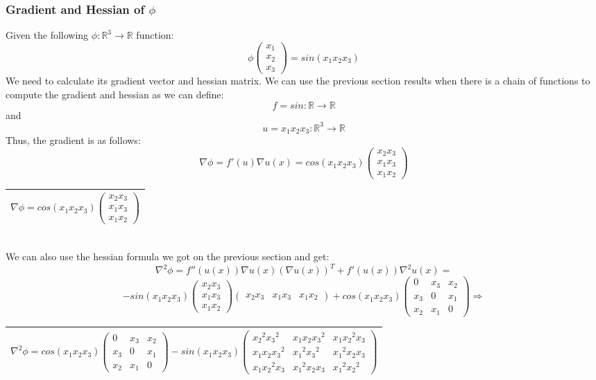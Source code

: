 \documentclass{article}
\newcommand{\rectres}[1]{
\begin{center}
\begin{tabular}{ |c| }
\hline
 #1\\
\hline
\end{tabular}
\end{center}
}
\begin{document}
\subsubsection{Gradient and Hessian of $\phi$}
Given the following $\phi:\mathbb{R}^3\rightarrow\mathbb{R}$ function:
$$\phi \begin{pmatrix}x_1\\x_2\\x_3 \end{pmatrix} = sin(x_1x_2x_3)$$
We need to calculate its gradient vector and hessian matrix.
We can use the previous section results when there is a chain of functions to compute the gradient and hessian as we can define:
$$f=sin:\mathbb{R}\rightarrow\mathbb{R}$$ and $$u=x_1x_2x_3:\mathbb{R}^3\rightarrow\mathbb{R}$$
Thus, the gradient is as follows:
$$\nabla \phi = f'(u)\nabla u(x) = cos(x_1x_2x_3)\begin{pmatrix}x_2x_3\\x_1x_3\\x_1x_2 \end{pmatrix}$$
\rectres{$\nabla \phi = cos(x_1x_2x_3)\begin{pmatrix}x_2x_3\\x_1x_3\\x_1x_2 \end{pmatrix}$}\\
We can also use the hessian formula we got on the previous section and get:
$$\nabla^2 \phi = f''(u(x))\nabla u(x)(\nabla u(x))^T + f'(u(x))\nabla^2 u(x)=$$
$$-sin(x_1x_2x_3)\begin{pmatrix}x_2x_3\\x_1x_3\\x_1x_2 \end{pmatrix}\begin{pmatrix}x_2x_3 & x_1x_3 & x_1x_2 \end{pmatrix} + cos(x_1x_2x_3)\begin{pmatrix}0 & x_3 & x_2\\x_3 & 0 & x_1\\x_2 & x_1 & 0 \end{pmatrix} \Rightarrow$$
\rectres{$\nabla^2 \phi = cos(x_1x_2x_3)\begin{pmatrix}0 & x_3 & x_2\\x_3 & 0 & x_1\\x_2 & x_1 & 0 \end{pmatrix} -sin(x_1x_2x_3)\begin{pmatrix}{x_2}^2{x_3}^2 & x_1x_2{x_3}^2 & x_1{x_2}^2x_3\\x_1x_2{x_3}^2 & {x_1}^2{x_3}^2 & {x_1}^2x_2x_3\\x_1{x_2}^2x_3 & {x_1}^2x_2x_3 & {x_1}^2{x_2}^2 \end{pmatrix}$}
\end{document}
